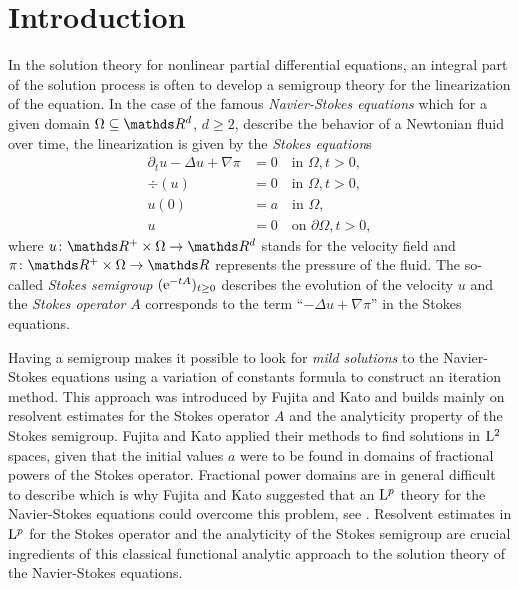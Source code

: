 \chapter*{Introduction}

In the solution theory for nonlinear partial differential equations, an integral part of the solution process is often to develop a semigroup theory for the linearization of the equation.
In the case of the famous \emph{Navier-Stokes equations} which for a given domain $\Omega \subseteq \R^d$, $d \geq 2$, describe the behavior of a Newtonian fluid over time, the linearization is given by the \emph{Stokes equation}s
\begin{align*}
  \partial_t u - \Delta u + \nabla \pi &= 0 \quad\text{in } \Omega, t > 0,\\
  \div(u) &= 0 \quad\text{in } \Omega, t > 0, \\
  u(0) &= a \quad\text{in } \Omega, \\
  u &= 0 \quad\text{on } \partial\Omega, t > 0,
\end{align*}
where $u \colon \R^+ \times \Omega \to \R^d$ stands for the velocity field and $\pi \colon \R^+ \times \Omega \to \R$ represents the pressure of the fluid.
The so-called \emph{Stokes semigroup} $(\mathrm{e}^{-tA})_{t \geq 0}$ describes the evolution of the velocity $u$ and the \emph{Stokes operator} $A$ corresponds to the term ``$-\Delta u + \nabla \pi$'' in the Stokes equations. 

Having a semigroup makes it possible to look for \emph{mild solutions} to the Navier-Stokes equations using a variation of constants formula to construct an iteration method.
This approach was introduced by Fujita and Kato \cite{fujitaKato,katoFujita} and builds mainly on resolvent estimates for the Stokes operator $A$ and the analyticity property of the Stokes semigroup.
Fujita and Kato applied their methods to find solutions in $\mathrm{L}^2$ spaces, given that the initial values $a$ were to be found in domains of fractional powers of the Stokes operator.
Fractional power domains are in general difficult to describe which is why Fujita and Kato suggested that an $\mathrm{L}^p$ theory for the Navier-Stokes equations could overcome this problem, see \cite[p.\@~313]{fujitaKato}.
Resolvent estimates in $\mathrm{L}^p$ for the Stokes operator and the analyticity of the Stokes semigroup are crucial ingredients of this classical functional analytic approach to the solution theory of the Navier-Stokes equations.

